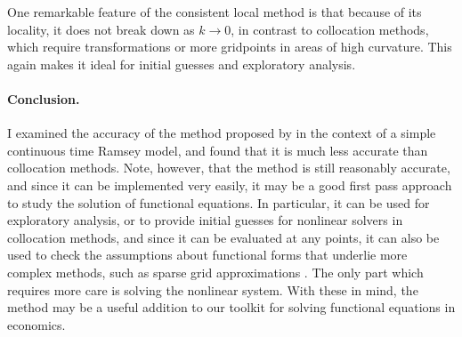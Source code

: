 \documentclass[a4paper,11pt]{article}
\begin{document}
One remarkable feature of the consistent local method is that because of its locality, it does not break down as $k\to0$, in contrast to collocation methods, which require transformations or more gridpoints in areas of high curvature. This again makes it ideal for initial guesses and exploratory analysis.

\paragraph{Conclusion.} I examined the accuracy of the method proposed by \textcite{den2015exact} in the context of a simple continuous time Ramsey model, and found that it is much less accurate than collocation methods. Note, however, that the method is still reasonably accurate, and since it can be implemented very easily, it may be a good first pass approach to study the solution of functional equations. In particular, it can be used for exploratory analysis, or to provide initial guesses for nonlinear solvers in collocation methods, and since it can be evaluated at any points, it can also be used to check the assumptions about functional forms that underlie more complex methods, such as sparse grid approximations \parencite{judd2014smolyak}. The only part which requires more care is solving the nonlinear system. With these in mind, the method may be a useful addition to our toolkit for solving functional equations in economics.

\clearpage
\printbibliography
\end{document}
